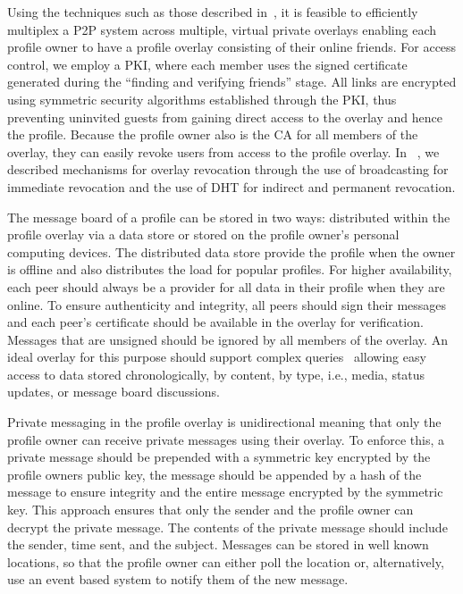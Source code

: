 \documentclass[letterpaper,twocolumn,10pt]{article}
\begin{document}
Using the techniques such as those described in~\cite{icdcs10}, it is feasible
to efficiently multiplex a P2P system across multiple, virtual private overlays enabling
each profile owner to have a profile overlay consisting of their online friends.
For access control, we employ a PKI, where each member uses the signed certificate
generated during the ``finding and verifying friends'' stage.  All links are
encrypted using symmetric security algorithms established through the PKI,
thus preventing uninvited guests from gaining direct access to the overlay and
hence the profile.  Because the profile owner also is the CA for all members of
the overlay, they can easily revoke users from access to the profile overlay.
In ~\cite{icdcs10}, we described mechanisms for overlay revocation through the
use of broadcasting for immediate revocation and the use of DHT for indirect
and permanent revocation.

The message board of a profile can be stored in two ways: distributed within the
profile overlay via a data store or stored on the profile owner's personal
computing devices.  The distributed data store provide the profile when the
owner is offline and also distributes the load for popular profiles.  For
higher availability, each peer should always be a provider for all data in their
profile when they are online.  To ensure authenticity and integrity, all peers
should sign their messages and each peer's certificate should be available in
the overlay for verification.  Messages that are unsigned should be ignored
by all members of the overlay.  An ideal overlay for this purpose should
support complex queries~\cite{complex_queries} allowing easy access to data
stored chronologically, by content, by type, i.e., media, status updates,
or message board discussions.

Private messaging in the profile overlay is unidirectional meaning that only
the profile owner can receive private messages using their overlay.  To
enforce this, a private message should be prepended with a symmetric key
encrypted by the profile owners public key, the message should be appended
by a hash of the message to ensure integrity and the entire message encrypted
by the symmetric key.  This approach ensures that only the sender and the
profile owner can decrypt the private message.  The contents of the private
message should include the sender, time sent, and the subject.  Messages can
be stored in well known locations, so that the profile owner can either poll
the location or, alternatively, use an event based system to notify them of
the new message.
\end{document}
